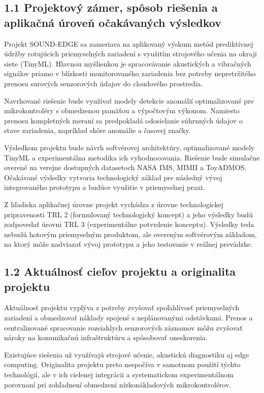 \documentclass[10pt,a4paper]{article}
\begin{document}
\subsection*{1.1 Projektový zámer, spôsob riešenia
a aplikačná úroveň očakávaných výsledkov}

Projekt SOUND-EDGE sa zameriava na aplikovaný výskum metód prediktívnej údržby rotujúcich priemyselných zariadení s využitím strojového učenia na okraji siete (TinyML). Hlavnou myšlienkou je spracovávanie akustických a vibračných signálov priamo v blízkosti monitorovaného zariadenia bez potreby nepretržitého prenosu surových senzorových údajov do cloudového prostredia.

Navrhované riešenie bude využívať modely detekcie anomálií optimalizované pre mikrokontroléry s obmedzenou pamäťou a výpočtovým výkonom. Namiesto prenosu kompletných meraní sa predpokladá odosielanie súhrnných údajov o stave zariadenia, napríklad skóre anomálie a časovej značky.

Výsledkom projektu bude návrh softvérovej architektúry, optimalizované modely TinyML a experimentálna metodika ich vyhodnocovania. Riešenie bude simulačne overené na verejne dostupných datasetoch NASA IMS, MIMII a ToyADMOS. Očakávané výsledky vytvoria technologický základ pre následný vývoj integrovaného prototypu a budúce využitie v priemyselnej praxi.

Z hľadiska aplikačnej úrovne projekt vychádza z úrovne technologickej pripravenosti TRL 2 (formulovaný technologický koncept) a jeho výsledky budú zodpovedať úrovni TRL 3 (experimentálne potvrdenie konceptu). Výsledky teda nebudú hotovým priemyselným produktom, ale overeným softvérovým základom, na ktorý môže nadviazať vývoj prototypu a jeho testovanie v reálnej prevádzke.

\subsection*{1.2 Aktuálnosť cieľov projektu
a originalita projektu}

Aktuálnosť projektu vyplýva z potreby zvyšovať spoľahlivosť priemyselných zariadení a obmedzovať náklady spojené s neplánovanými odstávkami. Prenos a centralizované spracovanie rozsiahlych senzorových záznamov môžu zvyšovať nároky na komunikačnú infraštruktúru a spôsobovať oneskorenia.

Existujúce riešenia už využívajú strojové učenie, akustickú diagnostiku aj edge computing. Originalita projektu preto nespočíva v samotnom použití týchto technológií, ale v ich cielenej integrácii a systematickom experimentálnom porovnaní pri zohľadnení obmedzení nízkonákladových mikrokontrolérov.
\end{document}
